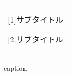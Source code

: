 \documentclass[11pt]{jsarticle}%
\begin{document}
 \begin{figure}[ht]%
  \centering%
  \begin{tabular}{c}%
   \begin{minipage}{0.5\hsize}%
    \centering
    \hspace{1.6cm} [1]サブタイトル%
   \end{minipage}

   \begin{minipage}{0.33\hsize}
    \centering
    \hspace{1.6cm} [2]サブタイトル%
   \end{minipage}
  \end{tabular}%
  \caption{caption.}%
  \label{label}%

 \end{figure}
\fi
\end{document}
